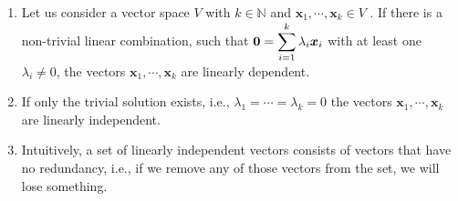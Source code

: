 \begin{enumerate}
    \item
    \begin{definition}
        Let us consider a vector space $V$ with $k \in \mathbb{N}$ and $\bm{x}_1, \cdots , \bm{x}_k \in V$ .
        If there is a non-trivial linear combination, such that $\bm{0} = \displaystyle\sum ^k _{i=1} \lambda_i \bm{x}_i$ with at least one $\lambda _i \neq 0$, the vectors  $\bm{x}_1, \cdots , \bm{x}_k$ are linearly dependent.
        \hfill \cite{mfml/book/mml/Deisenroth-Faisal-Ong}
    \end{definition}

    \item If only the trivial solution exists, i.e., $\lambda _1 = \cdots = \lambda _k = 0$ the vectors $\bm{x}_1, \cdots , \bm{x}_k$ are linearly independent.
    \hfill \cite{mfml/book/mml/Deisenroth-Faisal-Ong}

    \item Intuitively, a set of linearly independent vectors consists of vectors that have no redundancy, i.e., if we remove any of those vectors from the set, we will lose something.
    \hfill \cite{mfml/book/mml/Deisenroth-Faisal-Ong}
\end{enumerate}


